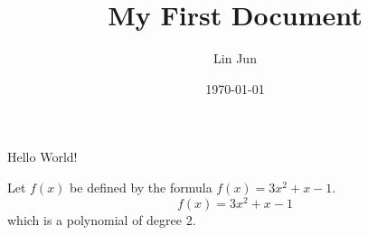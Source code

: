 \documentclass{article}%
\title{My First Document}
\author{Lin Jun}
\date{\today}
\begin{document}
   \maketitle 
   
   Hello World!
   
  Let $f(x)$ be defined by the formula
  $f(x)=3x^2+x-1$.
  $$f(x)=3x^2+x-1$$ which is a polynomial of degree 2.
  
\end{document}
